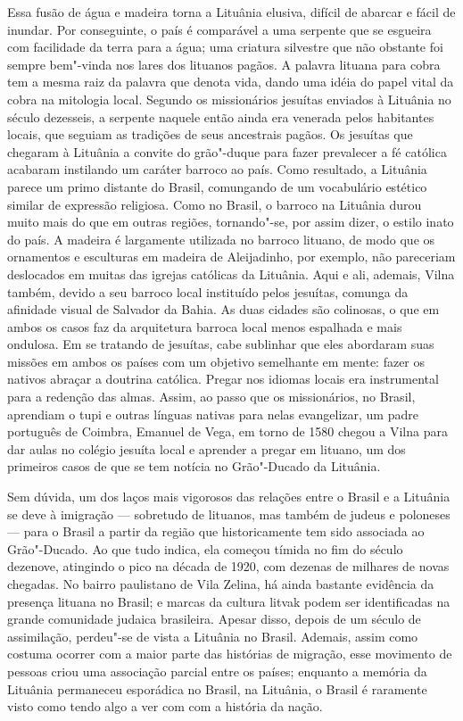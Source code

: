 Essa fusão de água e madeira torna a Lituânia elusiva, difícil de
abarcar e fácil de inundar. Por conseguinte, o país é comparável a uma
serpente que se esgueira com facilidade da terra para a água; uma
criatura silvestre que não obstante foi sempre bem"-vinda nos lares dos
lituanos pagãos. A palavra lituana para cobra tem a mesma raiz da
palavra que denota vida, dando uma idéia do papel vital da cobra na
mitologia local. Segundo os missionários jesuítas enviados à Lituânia no
século dezesseis, a serpente naquele então ainda era venerada pelos
habitantes locais, que seguiam as tradições de seus ancestrais pagãos.
Os jesuítas que chegaram à Lituânia a convite do grão"-duque para fazer
prevalecer a fé católica acabaram instilando um caráter barroco ao país.
Como resultado, a Lituânia parece um primo distante do Brasil,
comungando de um vocabulário estético similar de expressão religiosa.
Como no Brasil, o barroco na Lituânia durou muito mais do que em outras
regiões, tornando"-se, por assim dizer, o estilo inato do país. A madeira
é largamente utilizada no barroco lituano, de modo que os ornamentos e
esculturas em madeira de Aleijadinho, por exemplo, não pareceriam
deslocados em muitas das igrejas católicas da Lituânia. Aqui e ali,
ademais, Vilna também, devido a seu barroco local instituído pelos
jesuítas, comunga da afinidade visual de Salvador da Bahia. As duas
cidades são colinosas, o que em ambos os casos faz da arquitetura
barroca local menos espalhada e mais ondulosa. Em se tratando de
jesuítas, cabe sublinhar que eles abordaram suas missões em ambos os
países com um objetivo semelhante em mente: fazer os nativos abraçar a
doutrina católica. Pregar nos idiomas locais era instrumental para a
redenção das almas. Assim, ao passo que os missionários, no Brasil,
aprendiam o tupi e outras línguas nativas para nelas evangelizar, um
padre português de Coimbra, Emanuel de Vega, em torno de 1580 chegou a
Vilna para dar aulas no colégio jesuíta local e aprender a pregar em
lituano, um dos primeiros casos de que se tem notícia no Grão"-Ducado da
Lituânia.

Sem dúvida, um dos laços mais vigorosos das relações entre o Brasil e a
Lituânia se deve à imigração --- sobretudo de lituanos, mas também de
judeus e poloneses --- para o Brasil a partir da região que historicamente
tem sido associada ao Grão"-Ducado. Ao que tudo indica, ela começou
tímida no fim do século dezenove, atingindo o pico na década de 1920,
com dezenas de milhares de novas chegadas. No bairro paulistano de Vila
Zelina, há ainda bastante evidência da presença lituana no Brasil; e
marcas da cultura litvak podem ser identificadas na grande comunidade
judaica brasileira. Apesar disso, depois de um século de assimilação,
perdeu"-se de vista a Lituânia no Brasil. Ademais, assim como costuma
ocorrer com a maior parte das histórias de migração, esse movimento de
pessoas criou uma associação parcial entre os países; enquanto a memória
da Lituânia permaneceu esporádica no Brasil, na Lituânia, o Brasil é
raramente visto como tendo algo a ver com com a história da nação.

